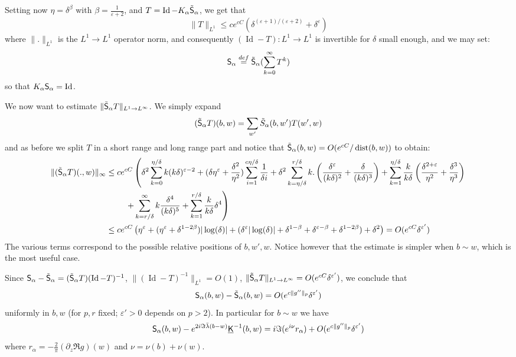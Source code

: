 \documentclass[10pt]{article}
\newcommand{\eps}{\varepsilon}
\newcommand{\uK}{{\underline {\sf K}}}
\newcommand{\rS}{{\sf S}}
\DeclareMathOperator{\dist}{dist}
\DeclareMathOperator{\Id}{Id}
\begin{document}
Setting now $\eta=\delta^{\beta}$ with $\beta=\frac{1}{\eps+2}$, and $T=\Id-K_\alpha\tilde\rS_\alpha$, we get that 
$$\lVert T\rVert_{L^1}\leq ce^{cC}(\delta^{(\eps+1)/(\eps+2)}+\delta^\eps)$$ 
where $\|.\|_{L^1}$ is the $L^1\rightarrow L^1$ operator norm, and consequently $(\Id-T):L^1\rightarrow L^1$ is invertible for $\delta$ small enough, and we may set:
$$\rS_\alpha\stackrel{def}{=}\tilde\rS_\alpha(\sum_{k=0}^\infty T^k)$$
so that $K_\alpha\rS_\alpha=\Id$.

We now want to estimate $\lVert\tilde\rS_\alpha T\rVert_{L^1\rightarrow L^\infty}$. We simply expand 
$$(\tilde\rS_\alpha T)(b,w)=\sum_{w'}\tilde S_\alpha(b,w')T(w',w)$$ 
and as before we split $T$ in a short range and long range part and notice that $\tilde\rS_\alpha(b,w)=O(e^{cC}/\dist(b,w))$ to obtain:
\begin{align*}
\|(\tilde\rS_\alpha T)(.,w)\|_\infty
&\leq 
ce^{cC}\left(\delta^2\sum_{k=0}^{\eta/\delta}k(k\delta)^{\eps-2}
+(\delta\eta^\eps+\frac{\delta^2}{\eta^2})\sum_{i=1}^{c\eta/\delta}\frac 1{\delta i}
+\delta^2\sum_{k=\eta/\delta}^{r/\delta}k.\left(\frac{\delta^{\eps}}{(k\delta)^2}+\frac{\delta}{(k\delta)^3}\right)+\sum_{k=1}^{\eta/\delta} \frac{k}{k\delta}\left(\frac{\delta^{2+\eps}}{\eta^2}+\frac{\delta^{3}}{\eta^3}\right)\right.\\
&{\rm\ \ \ \ \ \ \ }
\left.+\sum_{k=r/\delta}^\infty k\frac{\delta^4}{(k\delta)^5}+\sum_{k=1}^{r/\delta}\frac{k}{k\delta}\delta^{4}
\right)\\
&\leq ce^{cC}\left(\eta^\eps+(\eta^\eps+\delta^{1-2\beta})|\log(\delta)|+(\delta^\eps|\log(\delta)|+\delta^{1-\beta}+\delta^{\eps-\beta}+\delta^{1-2\beta})
+\delta^2\right)=O(e^{cC}\delta^{\eps'})
\end{align*}
%
The various terms correspond to the possible relative positions of $b,w',w$. Notice however that the estimate is simpler when $b\sim w$, which is the most useful case.

Since $\rS_\alpha-\tilde\rS_\alpha=(\tilde\rS_\alpha T)(\Id-T)^{-1}$, $\lVert(\Id-T)^{-1}\rVert_{L^1}=O(1)$, $\lVert\tilde\rS_\alpha T\rVert_{L^1\rightarrow L^\infty}=O(e^{cC}\delta^{\eps'})$, we conclude that  
$$\rS_\alpha(b,w)-\tilde\rS_\alpha(b,w)=O(e^{c\|g''\|_p}\delta^{\eps'})$$
uniformly in $b,w$ (for $p,r$ fixed; $\eps'>0$ depends on $p>2$). In particular for $b\sim w$ we have
%
\begin{equation}\label{eq:diagestplane}
\rS_\alpha(b,w)-e^{2i\Im\bar\lambda(b-w)}\uK^{-1}(b,w)=i\Im(e^{i\nu}r_\alpha)+O(e^{c\|g''\|_p}\delta^{\eps'})
\end{equation}
where $r_\alpha=-\frac 2\pi(\partial_z\Re g)(w)$ and $\nu=\nu(b)+\nu(w)$.
\end{document}
